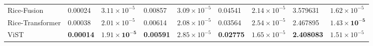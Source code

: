 \documentclass[acmsmall, screen]{acmart}
\begin{document}
\begin{table}[htbp]
{\begin{tabular}{lllllllll}
      Rice-Fusion & 0.00024 & \begin{math}3.11\times 10^{-5}\end{math} & 0.00857 & \begin{math}3.09\times 10^{-5}\end{math} & 0.04541 & \begin{math}2.14\times 10^{-5}\end{math} & 3.579631 & \begin{math}1.62\times 10^{-5}\end{math} \\
      Rice-Transformer & 0.00038 & \begin{math}2.01\times 10^{-5}\end{math} & 0.00614 & \begin{math}2.08\times 10^{-5}\end{math} & 0.03564 & \begin{math}2.54\times 10^{-5}\end{math} & 2.467895 & \begin{math}\mathbf{1.43\times 10^{-5}}\end{math} \\
      ViST  & \textbf{0.00014} & \begin{math}\mathbf{1.91\times 10^{-5}}\end{math} & \textbf{0.00591} & \begin{math}2.85\times 10^{-5}\end{math} & \textbf{0.02775} & \begin{math}1.65\times 10^{-5}\end{math} & \textbf{2.408083} & \begin{math}1.51\times 10^{-5}\end{math} \\
      \bottomrule
      \end{tabular}%
  }
   
  \label{tab:hybrid_results}%
\end{table}%
\end{document}
